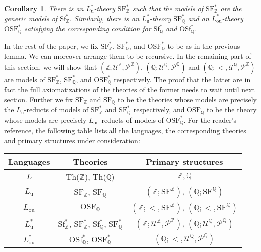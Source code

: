 \documentclass[letterpaper]{amsart}
\newcommand{\qq}{\mathbb{Q}}
\newcommand{\zz}{\mathbb{Z}}
\newcommand{\sU}{\mathscr{U}}
\newcommand{\sP}{\mathscr{P}}
\newcommand{\SF}{\mathrm{SF}^\zz}
\newcommand{\SQ}{\mathrm{SF}^\qq}
\newcommand{\SFZ}{\mathrm{SF}_{\zz}}
\newcommand{\SFQ}{\mathrm{SF}_{\qq}}
\newcommand{\OSFQ}{\mathrm{OSF}_{\qq}}
\newcommand{\TSFZ}{\mathrm{SF}^*_{\zz}}
\newcommand{\TSFQ}{\mathrm{SF}^*_{\qq}}
\newcommand{\TOSFQ}{\mathrm{OSF}^*_{\qq}}
\newcommand{\WSFZ}{\mathrm{Sf}^*_{\zz}}
\newcommand{\WSFQ}{\mathrm{Sf}^*_{\qq}}
\newcommand{\WOSFQ}{\mathrm{OSf}^*_{\qq}}
\newtheorem{cor}[thm]{Corollary}
\begin{document}
\begin{cor}
There is an $L_\mathrm{u}^*$-theory $\TSFZ$ such that the models of $\TSFZ$ are the  generic models of $\WSFZ$. Similarly, there is an $L_\mathrm{u}^*$-theory $\TSFQ$ and an $L_\mathrm{ou}^*$-theory $\TOSFQ$ satisfying the corresponding condition for $\WSFQ$ and $\WOSFQ$.
\end{cor}


\noindent In the rest of the paper, we fix $\TSFZ$, $\TSFQ$, and $\TOSFQ$ to be as in the previous lemma.  We can moreover arrange them to be recursive. In the remaining part of this section, we will show that  $(\zz; \sU^\zz, \sP^\zz)$, $(\qq; \sU^\qq, \sP^\qq)$ and $(\qq; <, \sU^\qq, \sP^\zz)$ are models of  $\TSFZ$, $\TSFQ$, and $\TOSFQ$ respectively. The proof that the latter are in fact the full axiomatizations of the theories of the former needs to wait until next section. Further we fix $\SFZ$ and $\SFQ$ to be the theories whose models are precisely the $L_{\mathrm{u}}$-reducts of models of $\TSFZ$ and $\TSFQ$ respectively, and $\OSFQ$ to be the theory whose models are precisely $L_{\mathrm{ou}}$ reducts of models of $\TOSFQ$.  For the reader's reference, the following table lists all the languages, the corresponding theories and primary structures under consideration:

\vspace{0.1in}
\begin{center}
\begingroup
\renewcommand{\arraystretch}{1.25}
\begin{tabular}{|c|c|c|} 
\hline
Languages & Theories & Primary structures  \\ [0.2ex] 
\hline\hline 
$L$ & Th($\zz$), Th($\qq$) & $\zz, \qq$\\ [0.2 ex]
\hline
$L_{\mathrm{u}}$  & $\SFZ$, $\SFQ$ & $(\zz; \SF)$, $(\qq; \SQ)$  \\ [0.2ex]  
\hline
$L_{\mathrm{ou}}$  &$\OSFQ$ & $(\zz; <, \SF)$, $(\qq;<, \SQ)$  \\ [0.2ex] 
\hline
$L_{\mathrm{u}}^*$ & $\WSFZ$, $\TSFZ$, $\WSFQ$, $\TSFQ$& $(\zz; \sU^\zz, \sP^\zz)$, $(\qq; \sU^\qq, \sP^\qq)$\\ [0.2ex] 
\hline
$L_{\mathrm{ou}}^*$ & $\WOSFQ$, $\TOSFQ$ & $(\qq; <, \sU^\qq, \sP^\qq)$  \\ [0.2ex] 
\hline
\end{tabular}
\endgroup
\end{center}
\end{document}
